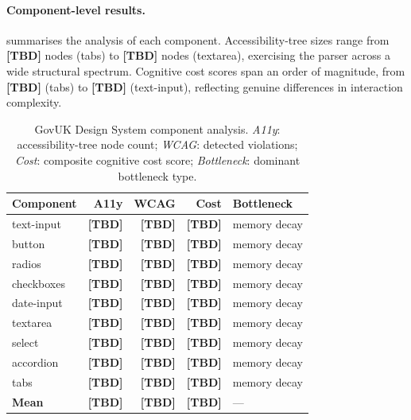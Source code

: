\documentclass[11pt,twocolumn]{article}
\theoremstyle{definition}
\begin{document}
\paragraph{Component-level results.}
 summarises the analysis of each component.
Accessibility-tree sizes range from \textbf{[TBD]} nodes (tabs) to \textbf{[TBD]} nodes (textarea), exercising the parser across a wide structural spectrum.
Cognitive cost scores span an order of magnitude, from \textbf{[TBD]} (tabs) to \textbf{[TBD]} (text-input), reflecting genuine differences in interaction complexity.

\begin{table}[t]
\centering
\caption{GovUK Design System component analysis. \emph{A11y}: accessibility-tree node count; \emph{WCAG}: detected violations; \emph{Cost}: composite cognitive cost score; \emph{Bottleneck}: dominant bottleneck type.}
\label{tab:govuk}
\small
\begin{tabular}{@{}lrrrl@{}}
\toprule
\textbf{Component} & \textbf{A11y} & \textbf{WCAG} & \textbf{Cost} & \textbf{Bottleneck} \\
\midrule
text-input  & \textbf{[TBD]} & \textbf{[TBD]} & \textbf{[TBD]} & memory decay \\
button      & \textbf{[TBD]} & \textbf{[TBD]} & \textbf{[TBD]} & memory decay \\
radios      & \textbf{[TBD]} & \textbf{[TBD]} & \textbf{[TBD]} & memory decay \\
checkboxes  & \textbf{[TBD]} & \textbf{[TBD]} & \textbf{[TBD]} & memory decay \\
date-input  & \textbf{[TBD]} & \textbf{[TBD]} & \textbf{[TBD]} & memory decay \\
textarea    & \textbf{[TBD]} & \textbf{[TBD]} & \textbf{[TBD]} & memory decay \\
select      & \textbf{[TBD]} & \textbf{[TBD]} & \textbf{[TBD]} & memory decay \\
accordion   & \textbf{[TBD]} & \textbf{[TBD]} & \textbf{[TBD]} & memory decay \\
tabs        & \textbf{[TBD]} & \textbf{[TBD]} & \textbf{[TBD]} & memory decay \\
\midrule
\textbf{Mean} & \textbf{[TBD]} & \textbf{[TBD]} & \textbf{[TBD]} & --- \\
\bottomrule
\end{tabular}
\end{table}
\end{document}
